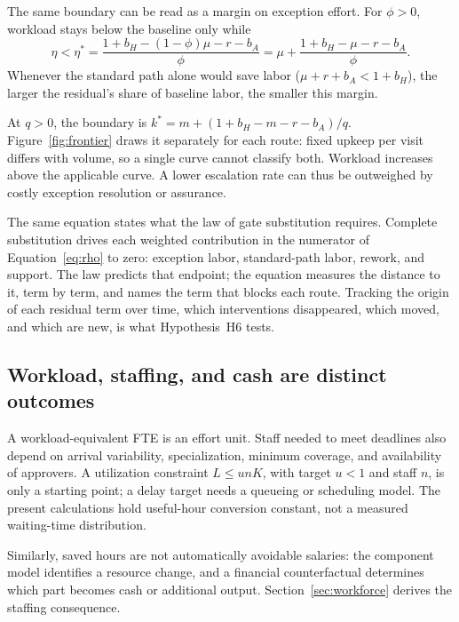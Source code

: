 The same boundary can be read as a margin on exception effort. For $\phi>0$, workload stays below
the baseline only while
\begin{equation}
\eta<\eta^{*}=\frac{1+b_H-(1-\phi)\mu-r-b_A}{\phi}
=\mu+\frac{1+b_H-\mu-r-b_A}{\phi}. \label{eq:etastar}
\end{equation}
Whenever the standard path alone would save labor ($\mu+r+b_A<1+b_H$), the larger the residual's
share of baseline labor, the smaller this margin.

At $q>0$, the boundary is $k^{*}=m+(1+b_H-m-r-b_A)/q$. Figure~\ref{fig:frontier} draws it separately
for each route: fixed upkeep per visit differs with volume, so a single curve cannot classify both.
Workload increases above the applicable curve. A lower escalation rate can thus be outweighed by
costly exception resolution or assurance.

The same equation states what the law of gate substitution requires. Complete substitution drives each weighted
contribution in the numerator of Equation~\eqref{eq:rho} to zero: exception labor, standard-path labor,
rework, and support. The law predicts that endpoint; the equation measures the distance to it, term by
term, and names the term that blocks each route. Tracking the origin of each residual term over time,
which interventions disappeared, which moved, and which are new, is what Hypothesis~H6 tests.

\subsection{Workload, staffing, and cash are distinct outcomes}
\label{sec:staffing}

A workload-equivalent FTE is an effort unit. Staff needed to meet deadlines also depend on arrival
variability, specialization, minimum coverage, and availability of approvers. A utilization constraint
$L\le unK$, with target $u<1$ and staff $n$, is only a starting point; a delay target needs a queueing
or scheduling model. The present calculations hold useful-hour conversion constant, not a measured
waiting-time distribution.

Similarly, saved hours are not automatically avoidable salaries: the component model identifies a
resource change, and a financial counterfactual determines which part becomes cash or additional
output. Section~\ref{sec:workforce} derives the staffing consequence.
